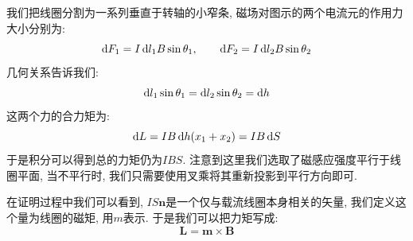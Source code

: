 我们把线圈分割为一系列垂直于转轴的小窄条, 磁场对图示的两个电流元的作用力大小分别为:
\[
\mathop{}\!\mathrm{d} F_1 = I\mathop{}\!\mathrm{d} l_1 B\sin\theta_1,\qquad \mathop{}\!\mathrm{d} F_2 = I\mathop{}\!\mathrm{d} l_2 B\sin\theta_2
\]
几何关系告诉我们:
\[
\mathop{}\!\mathrm{d} l_1 \sin\theta_1 =\mathop{}\!\mathrm{d} l_2 \sin\theta_2 = \mathop{}\!\mathrm{d} h
\]
这两个力的合力矩为:
\[
\mathop{}\!\mathrm{d} L = IB\mathop{}\!\mathrm{d} h(x_1+x_2) = I B \mathop{}\!\mathrm{d} S
\]
于是积分可以得到总的力矩仍为$IBS$. 注意到这里我们选取了磁感应强度平行于线圈平面, 当不平行时, 我们只需要使用叉乘将其重新投影到平行方向即可.

在证明过程中我们可以看到, $IS\mathbf{n}$是一个仅与载流线圈本身相关的矢量, 我们定义这个量为线圈的磁矩, 用$m$表示. 于是我们可以把力矩写成:
\[
\mathbf{L} = \mathbf{m} \times \mathbf{B}
\]

\clearpage


